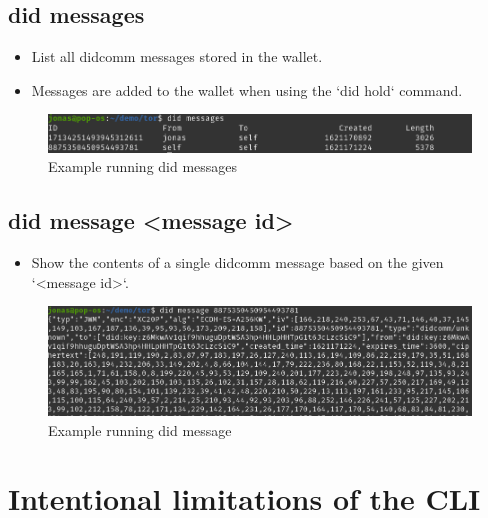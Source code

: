 \newpage

\subsection{did messages}
\begin{itemize}
\item List all didcomm messages stored in the wallet.
\item Messages are added to the wallet when using the `did hold` command.
\end{itemize}
    \begin{figure}[htbp]
      \centering
      \includegraphics[width=.7\textwidth]{figures/cmd-messages.png}
      \caption[]{Example running did messages}
    \end{figure}

\subsection{did message <message id>}
\begin{itemize}
\item Show the contents of a single didcomm message based on the given `<message id>`.
\end{itemize}
    \begin{figure}[htbp]
      \centering
      \includegraphics[width=.7\textwidth]{figures/cmd-message.png}
      \caption[]{Example running did message}
    \end{figure}

\section{Intentional limitations of the CLI}

